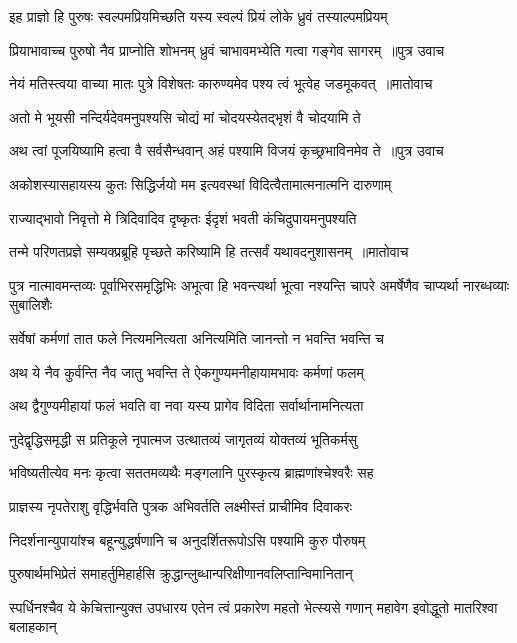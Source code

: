 \twolineshloka
{इह प्राज्ञो हि पुरुषः स्वल्पमप्रियमिच्छति}
{यस्य स्वल्पं प्रियं लोके ध्रुवं तस्याल्पमप्रियम्}


\threelineshloka
{प्रियाभावाच्च पुरुषो नैव प्राप्नोति शोभनम्}
{ध्रुवं चाभावमभ्येति गत्वा गङ्गेव सागरम् ॥पुत्र उवाच}
{}


\threelineshloka
{नेयं मतिस्त्वया वाच्या मातः पुत्रे विशेषतः}
{कारुण्यमेव पश्य त्वं भूत्वेह जडमूकवत् ॥मातोवाच}
{}


\twolineshloka
{अतो मे भूयसी नन्दिर्यदेवमनुपश्यसि}
{चोद्यं मां चोदयस्येतद्भृशं वै चोदयामि ते}


\threelineshloka
{अथ त्वां पूजयिष्यामि हत्वा वै सर्वसैन्धवान्}
{अहं पश्यामि विजयं कृच्छ्रभाविनमेव ते ॥पुत्र उवाच}
{}


\twolineshloka
{अकोशस्यासहायस्य कुतः सिद्धिर्जयो मम}
{इत्यवस्थां विदित्वैतामात्मनात्मनि दारुणाम्}


\twolineshloka
{राज्याद्भावो निवृत्तो मे त्रिदिवादिव दृष्कृतः}
{ईदृशं भवती कंचिदुपायमनुपश्यति}


\threelineshloka
{तन्मे परिणतप्रज्ञे सम्यक्प्रब्रूहि पृच्छते}
{करिष्यामि हि तत्सर्वं यथावदनुशासनम् ॥मातोवाच}
{}


\threelineshloka
{पुत्र नात्मावमन्तव्यः पूर्वाभिरसमृद्धिभिः}
{अभूत्वा हि भवन्त्यर्था भूत्वा नश्यन्ति चापरे}
{अमर्षेणैव चाप्यर्था नारब्धव्याः सुबालिशैः}


\twolineshloka
{सर्वेषां कर्मणां तात फले नित्यमनित्यता}
{अनित्यमिति जानन्तो न भवन्ति भवन्ति च}


\twolineshloka
{अथ ये नैव कुर्वन्ति नैव जातु भवन्ति ते}
{ऐकगुण्यमनीहायामभावः कर्मणां फलम्}


\twolineshloka
{अथ द्वैगुण्यमीहायां फलं भवति वा नवा}
{यस्य प्रागेव विदिता सर्वार्थानामनित्यता}


\twolineshloka
{नुदेद्वृद्धिसमृद्धी स प्रतिकूले नृपात्मज}
{उत्थातव्यं जागृतव्यं योक्तव्यं भूतिकर्मसु}


\twolineshloka
{भविष्यतीत्येव मनः कृत्वा सततमव्यथैः}
{मङ्गलानि पुरस्कृत्य ब्राह्मणांश्चेश्वरैः सह}


\twolineshloka
{प्राज्ञस्य नृपतेराशु वृद्धिर्भवति पुत्रक}
{अभिवर्तति लक्ष्मीस्तं प्राचीमिव दिवाकरः}


\twolineshloka
{निदर्शनान्युपायांश्च बहून्युद्धर्षणानि च}
{अनुदर्शितरूपोऽसि पश्यामि कुरु पौरुषम्}


\twolineshloka
{पुरुषार्थमभिप्रेतं समाहर्तुमिहार्हसि}
{क्रुद्धान्लुब्धान्परिक्षीणानवलिप्तान्विमानितान्}


\threelineshloka
{स्पर्धिनश्चैव ये केचित्तान्युक्त उपधारय}
{एतेन त्वं प्रकारेण महतो भेत्स्यसे गणान्}
{महावेग इवोद्धूतो मातरिश्वा बलाहकान्}


